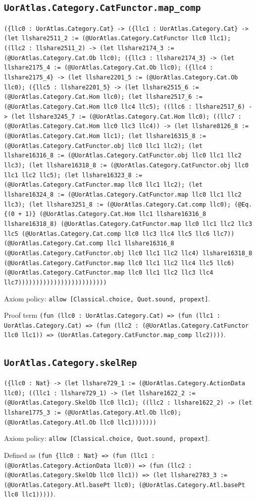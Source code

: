 \documentclass[11pt]{article}
\begin{document}
\subsection*{\texttt{UorAtlas.Category.CatFunctor.map\_comp}}
\noindent\texttt{(\{llc0 : UorAtlas.Category.Cat\} -> (\{llc1 : UorAtlas.Category.Cat\} -> (let llshare2511\_2 := (@UorAtlas.Category.CatFunctor llc0 llc1); ((llc2 : llshare2511\_2) -> (let llshare2174\_3 := (@UorAtlas.Category.Cat.Ob llc0); (\{llc3 : llshare2174\_3\} -> (let llshare2175\_4 := (@UorAtlas.Category.Cat.Ob llc0); (\{llc4 : llshare2175\_4\} -> (let llshare2201\_5 := (@UorAtlas.Category.Cat.Ob llc0); (\{llc5 : llshare2201\_5\} -> (let llshare2515\_6 := (@UorAtlas.Category.Cat.Hom llc0); (let llshare2517\_6 := (@UorAtlas.Category.Cat.Hom llc0 llc4 llc5); ((llc6 : llshare2517\_6) -> (let llshare3245\_7 := (@UorAtlas.Category.Cat.Hom llc0); ((llc7 : (@UorAtlas.Category.Cat.Hom llc0 llc3 llc4)) -> (let llshare8126\_8 := (@UorAtlas.Category.Cat.Hom llc1); (let llshare16315\_8 := (@UorAtlas.Category.CatFunctor.obj llc0 llc1 llc2); (let llshare16316\_8 := (@UorAtlas.Category.CatFunctor.obj llc0 llc1 llc2 llc3); (let llshare16318\_8 := (@UorAtlas.Category.CatFunctor.obj llc0 llc1 llc2 llc5); (let llshare16323\_8 := (@UorAtlas.Category.CatFunctor.map llc0 llc1 llc2); (let llshare16324\_8 := (@UorAtlas.Category.CatFunctor.map llc0 llc1 llc2 llc3); (let llshare3251\_8 := (@UorAtlas.Category.Cat.comp llc0); (@Eq.\{(0 + 1)\} (@UorAtlas.Category.Cat.Hom llc1 llshare16316\_8 llshare16318\_8) (@UorAtlas.Category.CatFunctor.map llc0 llc1 llc2 llc3 llc5 (@UorAtlas.Category.Cat.comp llc0 llc3 llc4 llc5 llc6 llc7)) (@UorAtlas.Category.Cat.comp llc1 llshare16316\_8 (@UorAtlas.Category.CatFunctor.obj llc0 llc1 llc2 llc4) llshare16318\_8 (@UorAtlas.Category.CatFunctor.map llc0 llc1 llc2 llc4 llc5 llc6) (@UorAtlas.Category.CatFunctor.map llc0 llc1 llc2 llc3 llc4 llc7)))))))))))))))))))))))))}\par
\noindent Axiom policy: \texttt{allow [Classical.choice, Quot.sound, propext]}.\par
\noindent Proof term \texttt{(fun (llc0 : UorAtlas.Category.Cat) => (fun (llc1 : UorAtlas.Category.Cat) => (fun (llc2 : (@UorAtlas.Category.CatFunctor llc0 llc1)) => (UorAtlas.Category.CatFunctor.map\_comp llc2))))}.\par
\subsection*{\texttt{UorAtlas.Category.skelRep}}
\noindent\texttt{(\{llc0 : Nat\} -> (let llshare729\_1 := (@UorAtlas.Category.ActionData llc0); ((llc1 : llshare729\_1) -> (let llshare1622\_2 := (@UorAtlas.Category.SkelOb llc0 llc1); ((llc2 : llshare1622\_2) -> (let llshare1775\_3 := (@UorAtlas.Category.Atl.Ob llc0); (@UorAtlas.Category.Atl.Ob llc0 llc1)))))))}\par
\noindent Axiom policy: \texttt{allow [Classical.choice, Quot.sound, propext]}.\par
\noindent Defined as \texttt{(fun \{llc0 : Nat\} => (fun (llc1 : (@UorAtlas.Category.ActionData llc0)) => (fun (llc2 : (@UorAtlas.Category.SkelOb llc0 llc1)) => (let llshare2783\_3 := (@UorAtlas.Category.Atl.basePt llc0); (@UorAtlas.Category.Atl.basePt llc0 llc1)))))}.\par
\end{document}
